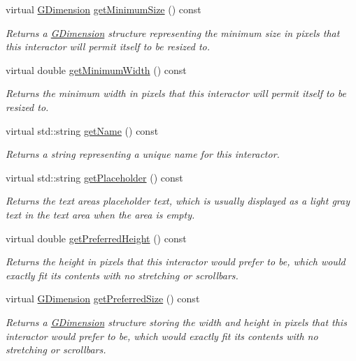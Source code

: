 \begin{DoxyCompactItemize}
virtual \mbox{\hyperlink{structsgl_1_1GDimension}{G\+Dimension}} \mbox{\hyperlink{classsgl_1_1GInteractor_a66b5af0b32493b4d597ca0a3df2049ea}{get\+Minimum\+Size}} () const
\begin{DoxyCompactList}\small\item\em Returns a \mbox{\hyperlink{structsgl_1_1GDimension}{G\+Dimension}} structure representing the minimum size in pixels that this interactor will permit itself to be resized to. \end{DoxyCompactList}\item 
virtual double \mbox{\hyperlink{classsgl_1_1GInteractor_a59e668114fe3d49d2a0f28deb258f7c8}{get\+Minimum\+Width}} () const
\begin{DoxyCompactList}\small\item\em Returns the minimum width in pixels that this interactor will permit itself to be resized to. \end{DoxyCompactList}\item 
virtual std\+::string \mbox{\hyperlink{classsgl_1_1GInteractor_a8a60438a5b55d0b2ceb35c8674b9d8c5}{get\+Name}} () const
\begin{DoxyCompactList}\small\item\em Returns a string representing a unique name for this interactor. \end{DoxyCompactList}\item 
virtual std\+::string \mbox{\hyperlink{classsgl_1_1GTextArea_aa78dbaa7dac1f8cdf9048c91abecc7ad}{get\+Placeholder}} () const
\begin{DoxyCompactList}\small\item\em Returns the text area\textquotesingle{}s placeholder text, which is usually displayed as a light gray text in the text area when the area is empty. \end{DoxyCompactList}\item 
virtual double \mbox{\hyperlink{classsgl_1_1GInteractor_a747de0961653847bdc6615dbf756d715}{get\+Preferred\+Height}} () const
\begin{DoxyCompactList}\small\item\em Returns the height in pixels that this interactor would prefer to be, which would exactly fit its contents with no stretching or scrollbars. \end{DoxyCompactList}\item 
virtual \mbox{\hyperlink{structsgl_1_1GDimension}{G\+Dimension}} \mbox{\hyperlink{classsgl_1_1GInteractor_a4aabbee761d8e9116275401131b7ccd1}{get\+Preferred\+Size}} () const
\begin{DoxyCompactList}\small\item\em Returns a \mbox{\hyperlink{structsgl_1_1GDimension}{G\+Dimension}} structure storing the width and height in pixels that this interactor would prefer to be, which would exactly fit its contents with no stretching or scrollbars. \end{DoxyCompactList}\item 

\end{DoxyCompactItemize}
